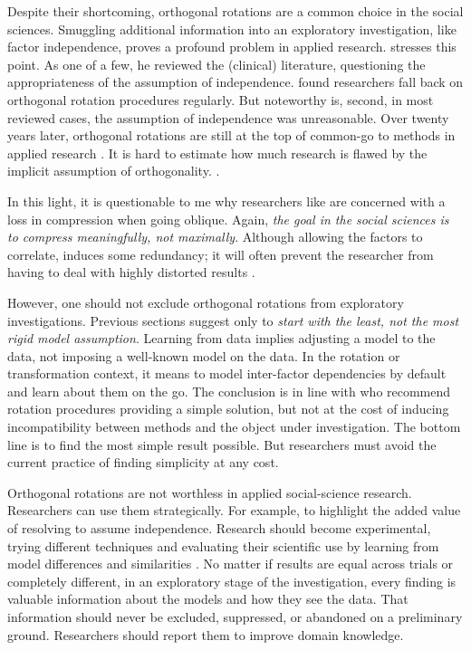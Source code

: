 \documentclass[jou, 11pt]{apa7}
\begin{document}
Despite their shortcoming, orthogonal rotations are a common choice in the
social sciences. Smuggling additional information into an exploratory
investigation, like factor independence, proves a profound problem in applied
research. \textcite{Loo1979} stresses this point. As one of a few, he reviewed
the (clinical) literature, questioning the appropriateness of the assumption of
independence. \textcite{Loo1979} found researchers fall back on orthogonal
rotation procedures regularly. But noteworthy is, second, in most reviewed
cases, the assumption of independence was unreasonable. Over twenty years
later, orthogonal rotations are still at the top of common-go to methods in
applied research \parencite{Ford1986, Costello2005}. It is hard to estimate how
much research is flawed by the implicit assumption of orthogonality.
.

In this light, it is questionable to me why researchers like
\textcite{Bortz2016} are concerned with a loss in compression when going
oblique. Again, \textit{the goal in the social sciences is to compress
meaningfully, not maximally}. Although allowing the factors to correlate,
induces some redundancy; it will often prevent the researcher from having to
deal with highly distorted results \parencite{Sass2010}.

However, one should not exclude orthogonal rotations from exploratory
investigations. Previous sections suggest only to \textit{start with the least,
not the most rigid model assumption}. Learning from data implies adjusting a
model to the data, not imposing a well-known model on the data. In the rotation
or transformation context, it means to model inter-factor dependencies by
default and learn about them on the go. The conclusion is in line with
\textcite{Sass2010, Muthen1984} who recommend rotation procedures providing a
simple solution, but not at the cost of inducing incompatibility between
methods and the object under investigation. The bottom line is to find the most
simple result possible. But researchers must avoid the current practice of
finding simplicity at any cost.

Orthogonal rotations are not worthless in applied social-science research.
Researchers can use them strategically. For example, to highlight the added
value of resolving to assume independence. Research should become experimental,
trying different techniques and evaluating their scientific use by learning
from model differences and similarities \parencite[p.642]{Tabachnick2007}. No
matter if results are equal across trials or completely different, in an
exploratory stage of the investigation, every finding is valuable information
about the models and how they see the data. That information should never be
excluded, suppressed, or abandoned on a preliminary ground. Researchers should
report them to improve domain knowledge.
\end{document}
